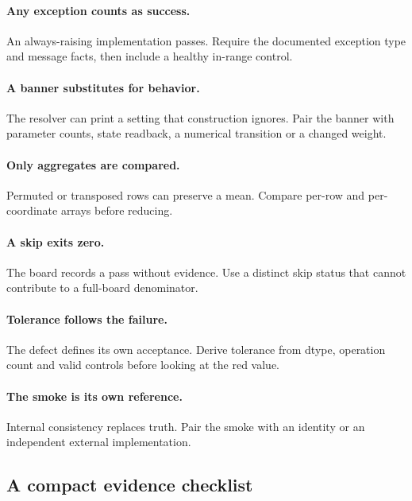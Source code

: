 \documentclass[10pt,aps,prd,twocolumn,nofootinbib]{revtex4-2}
\begin{document}
\paragraph{Any exception counts as success.}
An always-raising implementation passes.  Require the documented exception
type and message facts, then include a healthy in-range control.

\paragraph{A banner substitutes for behavior.}
The resolver can print a setting that construction ignores.  Pair the banner
with parameter counts, state readback, a numerical transition or a changed
weight.

\paragraph{Only aggregates are compared.}
Permuted or transposed rows can preserve a mean.  Compare per-row and
per-coordinate arrays before reducing.

\paragraph{A skip exits zero.}
The board records a pass without evidence.  Use a distinct skip status that
cannot contribute to a full-board denominator.

\paragraph{Tolerance follows the failure.}
The defect defines its own acceptance.  Derive tolerance from dtype,
operation count and valid controls before looking at the red value.

\paragraph{The smoke is its own reference.}
Internal consistency replaces truth.  Pair the smoke with an identity or an
independent external implementation.

\subsection{A compact evidence checklist}
\end{document}
